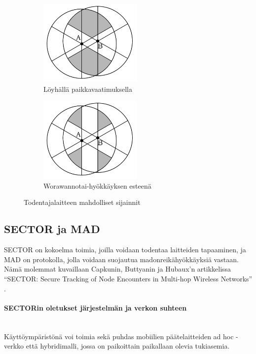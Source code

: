\documentclass[finnish]{tktltiki2}
\theoremstyle{definition}
\theoremstyle{remark}
\begin{document}
\begin{figure}[ht]
\begin{subfigure}{.5\textwidth}
  \centering
  \includegraphics[width=5cm]{verifier-loose}
  \caption{Löyhällä paikkavaatimuksella}
  \label{fig:sub1}
\end{subfigure}%
\begin{subfigure}{.5\textwidth}
  \centering
  \includegraphics[width=5cm]{verifier-strict}
  \caption{Worawannotai-hyökkäyksen esteenä}
  \label{fig:sub2}
\end{subfigure}%
\caption{Todentajalaitteen mahdolliset sijainnit}
\label{fig:test}
\end{figure}


\subsection{SECTOR ja MAD}

SECTOR on kokoelma toimia, joilla voidaan todentaa laitteiden tapaaminen, ja MAD on protokolla, jolla voidaan suojautua madonreikähyökkäyksiä vastaan. Nämä molemmat kuvaillaan Capkunin, Buttyanin ja Hubaux'n artikkelissa ``SECTOR: Secure Tracking of Node Encounters in Multi-hop Wireless Networks'' \cite{sector}.

\paragraph{SECTORin oletukset järjestelmän ja verkon suhteen}
\noindent \\
Käyttöympäristönä voi toimia sekä puhdas mobiilien päätelaitteiden ad hoc -verkko että hybridimalli, jossa on paikoittain paikallaan olevia tukiasemia. 
\end{document}
